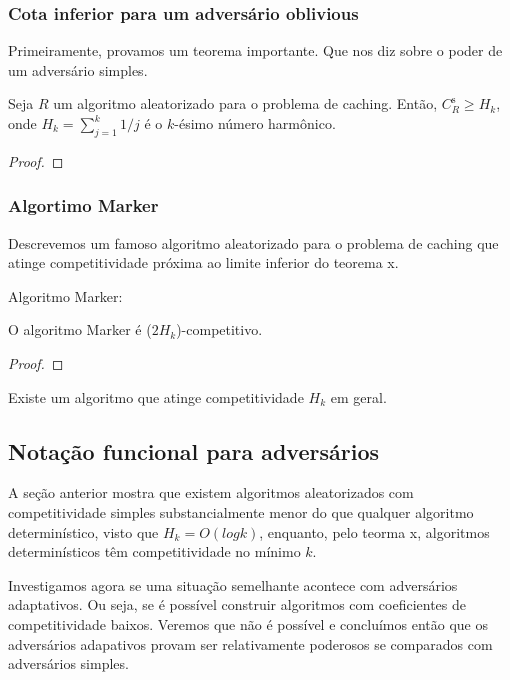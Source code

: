\documentclass[a4paper,oneside,reqno,12pt]{amsart}
\begin{document}
\subsubsection{Cota inferior para um adversário oblivious}

Primeiramente, provamos um teorema importante. Que nos diz sobre o poder de um adversário simples.

\begin{theorem}
  Seja $R$ um algoritmo aleatorizado para o problema de caching. Então, $C_R^{\text{s}} \geqslant H_k$, onde $H_k = \sum_{j = 1}^{k} 1/j$ é o $k$-ésimo número harmônico.
  \begin{proof}
  \end{proof}
\end{theorem}


\subsubsection{Algortimo Marker}

Descrevemos um famoso algoritmo aleatorizado para o problema de caching que atinge competitividade próxima ao limite inferior do teorema x.

Algoritmo Marker: 

\begin{theorem}

  O algoritmo Marker é ($2H_k$)-competitivo.
  
  \begin{proof}
    
  \end{proof}
  
\end{theorem}


Existe um algoritmo que atinge competitividade $H_k$ em geral.

\subsection{Notação funcional para adversários}

A seção anterior mostra que existem algoritmos aleatorizados com competitividade simples substancialmente menor do que qualquer algoritmo determinístico, visto que $H_k = O(log k)$, enquanto, pelo teorma x, algoritmos determinísticos têm competitividade no mínimo $k$.

Investigamos agora se uma situação semelhante acontece com adversários adaptativos. Ou seja, se é possível construir algoritmos com coeficientes de competitividade baixos. Veremos que não é possível e concluímos então que os adversários adapativos provam ser relativamente poderosos se comparados com adversários simples.
\end{document}
